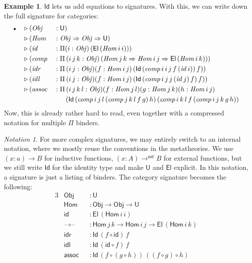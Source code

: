 \documentclass[12pt,a4paper,twoside,openany]{book}
\theoremstyle{remark}
\newtheorem{notation}{Notation}
\theoremstyle{definition}
\newtheorem{myexample}{Example}
\theoremstyle{theorem}
\newcommand{\mi}[1]{\mathit{#1}}
\newcommand{\ms}[1]{\mathsf{#1}}
\newcommand{\U}{\mathsf{U}}
\newcommand{\El}{\mathsf{El}}
\newcommand{\Id}{\mathsf{Id}}
\newcommand{\blank}{\mathord{\hspace{1pt}\text{--}\hspace{1pt}}}
\newcommand{\ext}{\triangleright}
\newcommand{\emptycon}{\scaleobj{.75}\bullet}
\newcommand{\funi}{\Rightarrow}
\newcommand{\toe}{\to^{\ms{ext}}}
\begin{document}
\begin{myexample} $\Id$ lets us add equations to signatures. With this, we can write down the full
signature for categories:
\begin{alignat*}{3}
  & \emptycon &&\ext (\mi{Obj}   &&: \U)\\
  &           &&\ext (\mi{Hom}   &&: \mi{Obj} \funi \mi{Obj} \funi \U)\\
  &           &&\ext (\mi{id}    &&: \Pi(i : \mi{Obj})\,(\El\,(\mi{Hom}\,i\,i)))\\
  &           &&\ext (\mi{comp}  &&: \Pi\,(i\,j\,k : \mi{Obj})\,(\mi{Hom}\,j\,k \funi \mi{Hom}\,i\,j \funi \El\,(\mi{Hom}\,i\,k)))\\
  &           &&\ext (\mi{idr}   &&: \Pi\,(i\,j : \mi{Obj})(f : \mi{Hom}\,i\,j)\,(\Id\,(\mi{comp}\,i\,i\,j\,f\,(\mi{id}\,i))\,f))\\
  &           &&\ext (\mi{idl}   &&: \Pi\,(i\,j : \mi{Obj})(f : \mi{Hom}\,i\,j)\,(\Id\,(\mi{comp}\,i\,j\,j\,(\mi{id}\,j)\,f)\,f))\\
  &           &&\ext (\mi{assoc} &&: \Pi\,(i\,j\,k\,l : \mi{Obj})(f : \mi{Hom}\,j\,l)(g : \mi{Hom}\,j\,k)(h : \mi{Hom}\,i\,j)\\
  &           && &&\hspace{1.7em} (\Id
                 \,(\mi{comp}\,i\,j\,l\,(\mi{comp}\,j\,k\,l\,f\,g)\,h)
                 \,(\mi{comp}\,i\,k\,l\,f\,(\mi{comp}\,i\,j\,k\,g\,h))
\end{alignat*}
Now, this is already rather hard to read, even together with a compressed
notation for multiple $\Pi$ binders.
\begin{notation}
For more complex signatures, we may entirely switch to an internal notation,
where we mostly reuse the conventions in the metatheories. We use $(x :
a) \to B$ for inductive functions, $(x : A) \toe B$ for external functions,
but we still write $\Id$ for the identity type and make $\U$ and $\El$
explicit. In this notation, a signature is just a listing of binders. The category
signature becomes the following:
\begin{alignat*}{3}
  & \ms{Obj} &&: \U\\
  & \ms{Hom} &&: \ms{Obj} \to \ms{Obj} \to \U\\
  & \ms{id}  &&: \El\,(\ms{Hom}\,i\,i)\\
  & \ms{\blank\!\circ\!\blank} &&: \ms{Hom}\,j\,k \to \ms{Hom}\,i\,j \to \El\,(\ms{Hom}\,i\,k)\\
  & \ms{idr} &&: \Id\,(f \circ \ms{id})\,f\\
  & \ms{idl} &&: \Id\,(\ms{id} \circ f)\,f\\
  & \ms{assoc} &&: \Id\,(f \circ (g \circ h))\,((f \circ g) \circ h)
\end{alignat*}
\end{notation}
\end{myexample}
\end{document}
